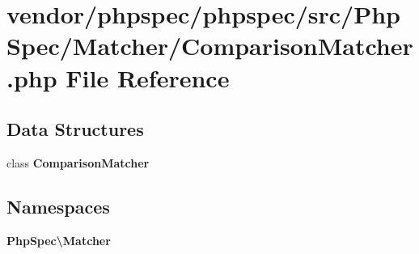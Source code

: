 \section{vendor/phpspec/phpspec/src/\+Php\+Spec/\+Matcher/\+Comparison\+Matcher.php File Reference}
\label{_comparison_matcher_8php}
\subsection*{Data Structures}
\begin{DoxyCompactItemize}
\item 
class {\bf Comparison\+Matcher}
\end{DoxyCompactItemize}
\subsection*{Namespaces}
\begin{DoxyCompactItemize}
\item 
 {\bf Php\+Spec\textbackslash{}\+Matcher}
\end{DoxyCompactItemize}
